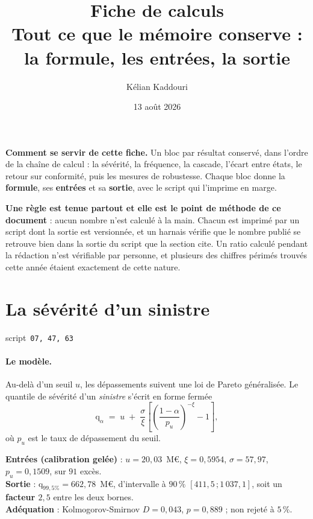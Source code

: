 \documentclass[11pt,a4paper]{article}
\title{\vspace{-1.3cm}\color{navy}\bfseries Fiche de calculs\\[2pt]
  \large Tout ce que le mémoire conserve : la formule, les entrées, la sortie}
\author{Kélian Kaddouri}
\date{13 août 2026}
\newcommand{\src}[1]{\hfill{\footnotesize\textsf{script~\texttt{#1}}}}
\begin{document}
\maketitle
\thispagestyle{fancy}
\vspace{-0.7cm}

\begin{cle}
\textbf{Comment se servir de cette fiche.} Un bloc par résultat conservé, dans l'ordre de la
chaîne de calcul : la sévérité, la fréquence, la cascade, l'écart entre états, le retour sur
conformité, puis les mesures de robustesse. Chaque bloc donne la \textbf{formule}, ses
\textbf{entrées} et sa \textbf{sortie}, avec le script qui l'imprime en marge.

\textbf{Une règle est tenue partout et elle est le point de méthode de ce document} : aucun
nombre n'est calculé à la main. Chacun est imprimé par un script dont la sortie est versionnée,
et un harnais vérifie que le nombre publié se retrouve bien dans la sortie du script que la
section cite. Un ratio calculé pendant la rédaction n'est vérifiable par personne, et plusieurs
des chiffres périmés trouvés cette année étaient exactement de cette nature.
\end{cle}

\section{La sévérité d'un sinistre}
\src{\texttt{07}, \texttt{47}, \texttt{63}}

\paragraph{Le modèle.} Au-delà d'un seuil $u$, les dépassements suivent une loi de Pareto
généralisée. Le quantile de sévérité d'un \emph{sinistre} s'écrit en forme fermée
\begin{equation}
\mathrm{q}_{\alpha} \;=\; u \;+\; \frac{\sigma}{\xi}
  \left[\left(\frac{1-\alpha}{p_u}\right)^{-\xi} - 1\right],
\end{equation}
où $p_u$ est le taux de dépassement du seuil.

\begin{res}
\textbf{Entrées (calibration gelée)} : $u = 20{,}03$~M\euro, $\xi = 0{,}5954$,
$\sigma = 57{,}97$, $p_u = 0{,}1509$, sur $91$ excès.\\
\textbf{Sortie} : $\mathrm{q}_{99,5\%} = 662{,}78$~M\euro, d'intervalle à $90\,\%$
$[411{,}5\,;1\,037{,}1]$, soit un \textbf{facteur $2{,}5$} entre les deux bornes.\\
\textbf{Adéquation} : Kolmogorov-Smirnov $D = 0{,}043$, $p = 0{,}889$ ; non rejeté à $5\,\%$.
\end{res}
\end{document}
